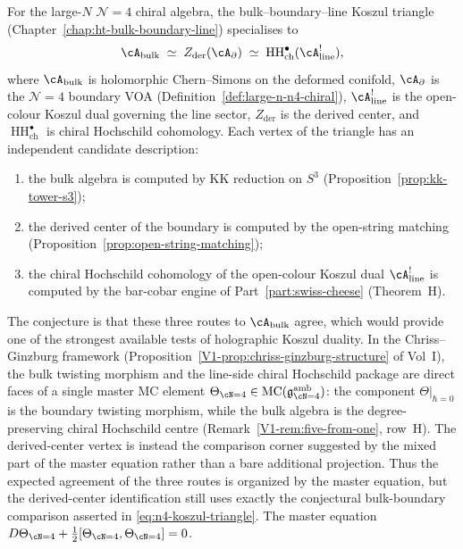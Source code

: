 \begin{conjecture}[The Koszul triangle for $\mathcal{N}=4$;
\ClaimStatusConjectured]
For the large-$N$ $\mathcal{N}=4$ chiral algebra, the
bulk--boundary--line Koszul triangle
(Chapter~\ref{chap:ht-bulk-boundary-line}) specialises to
\begin{equation}%
 \cA_{\mathrm{bulk}}
 \;\simeq\;
 Z_{\mathrm{der}}(\cA_{\partial})
 \;\simeq\;
 \operatorname{HH}^\bullet_{\mathrm{ch}}(\cA^!_{\mathrm{line}}),
\end{equation}
where $\cA_{\mathrm{bulk}}$ is holomorphic Chern--Simons on the
deformed conifold, $\cA_\partial$ is the $\mathcal{N}=4$ boundary VOA
(Definition~\ref{def:large-n-n4-chiral}), $\cA^!_{\mathrm{line}}$ is
the open-colour Koszul dual governing the line sector,
$Z_{\mathrm{der}}$ is the derived center, and
$\operatorname{HH}^\bullet_{\mathrm{ch}}$ is chiral Hochschild
cohomology. Each vertex of the triangle has an independent
candidate description:
\begin{enumerate}[label=\textup{(\roman*)},nosep]
\item the bulk algebra is computed by KK reduction on $S^3$
 (Proposition~\ref{prop:kk-tower-s3});
\item the derived center of the boundary is computed by the open-string
 matching (Proposition~\ref{prop:open-string-matching});
\item the chiral Hochschild cohomology of the open-colour Koszul dual
 $\cA^!_{\mathrm{line}}$ is computed by the bar-cobar engine of
 Part~\ref{part:swiss-cheese} (Theorem~H).
\end{enumerate}
The conjecture is that these three routes to $\cA_{\mathrm{bulk}}$
agree, which would provide one of the strongest available tests of
holographic Koszul duality. In the Chriss--Ginzburg framework
(Proposition~\ref*{V1-prop:chriss-ginzburg-structure} of Vol~I),
the bulk twisting morphism and the line-side chiral Hochschild
package are direct faces of a single master MC element
$\Theta_{\cN=4} \in
\operatorname{MC}(\mathfrak{g}^{\mathrm{amb}}_{\cN=4})$:
the component $\Theta\big|_{\hbar=0}$ is the boundary twisting
morphism, while the bulk algebra is the degree-preserving chiral
Hochschild centre
(Remark~\ref*{V1-rem:five-from-one}, row~H). The derived-center
vertex is instead the comparison corner suggested by the mixed part
of the master equation rather than a bare additional projection.
Thus the expected agreement of the three routes is organized by the master
equation, but the derived-center identification still uses exactly
the conjectural bulk-boundary comparison asserted in
\eqref{eq:n4-koszul-triangle}. The master equation
$D\Theta_{\cN=4} + \tfrac{1}{2}[\Theta_{\cN=4},\Theta_{\cN=4}] = 0$.
\end{conjecture}

